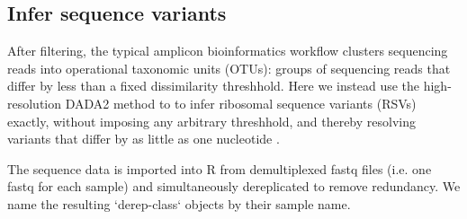 \begin{knitrout}
\color{fgcolor}\begin{kframe}
\begin{alltt}
\hlstd{(}\hlopt{!}\hlstd{(} 
 \hlkwb{<-}  
 \hlkwb{<-}  
  
  \hlstd{(}
                    \hlstd{=}\hlstd{,} \hlstd{=}\hlstd{(}\hlstd{,} \hlstd{),}
                    \hlstd{=}\hlstd{,} \hlstd{=}\hlstd{,} \hlstd{=}\hlstd{,}
                    \hlstd{=}\hlstd{)}
\hlstd{\}}
\end{alltt}
\end{kframe}
\end{knitrout}

\subsection*{Infer sequence variants}
After filtering, the typical amplicon bioinformatics workflow clusters
sequencing reads into operational taxonomic units (OTUs): groups of
sequencing reads that differ by less than a fixed dissimilarity
threshhold. Here we instead use the high-resolution DADA2
method to to infer ribosomal sequence variants (RSVs) exactly, without imposing
any arbitrary threshhold, and thereby
resolving variants that differ by as little as one nucleotide \cite{dada2}.

The sequence data is imported into R from demultiplexed fastq files (i.e. one
fastq for each sample) and simultaneously dereplicated to remove redundancy. We
name the resulting `derep-class` objects by their sample name.

\begin{knitrout}
\color{fgcolor}\begin{kframe}
\begin{alltt}
 \hlkwb{<-} 
 \hlkwb{<-} 
 \hlkwb{<-} \hlstd{(}\hlstd{(} \hlstd{), `[`,} \hlstd{)}
 \hlkwb{<-} 
 \hlkwb{<-} 
\end{alltt}
\end{kframe}
\end{knitrout}

